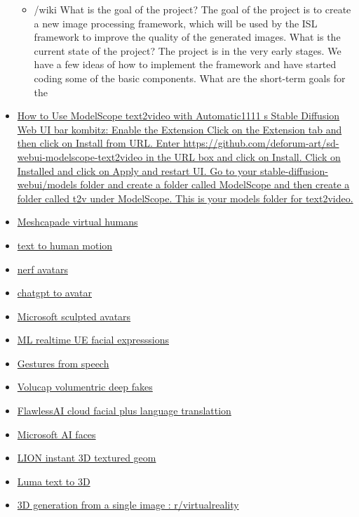 \begin{itemize}
\begin{itemize}
  \item
    /wiki What is the goal of the project? The goal of the project is to
    create a new image processing framework, which will be used by the
    ISL framework to improve the quality of the generated images. What
    is the current state of the project? The project is in the very
    early stages. We have a few ideas of how to implement the framework
    and have started coding some of the basic components. What are the
    short-term goals for the
  \end{itemize}
\item
  \href{https://www.kombitz.com/2023/03/28/how-to-use-modelscope-text2video-with-automatic1111s-stable-diffusion-web-ui/}{How
  to Use ModelScope text2video with Automatic1111 s Stable Diffusion Web
  UI bar{} kombitz: Enable the Extension Click on the Extension tab
  and then click on Install from URL. Enter
  https://github.com/deforum-art/sd-webui-modelscope-text2video in the
  URL box and click on Install. Click on Installed and click on Apply
  and restart UI. Go to your stable-diffusion-webui/models folder and
  create a folder called ModelScope and then create a folder called t2v
  under ModelScope. This is your models folder for text2video.}
\item
  \href{https://meshcapade.com/}{Meshcapade virtual humans}
\item
  \href{https://ofa-sys.github.io/MoFusion/}{text to human motion}
\item
  \href{https://www.linkedin.com/posts/reneschulte_nerf-deeplearning-metaverse-activity-7010898662465617921-56P_?utm_source=share\&utm_medium=member_desktop}{nerf
  avatars}
\item
  \href{https://twitter.com/IntuitMachine/status/1608690077139599360}{chatgpt
  to avatar}
\item
  \href{https://3d-avatar-diffusion.microsoft.com/?utm_campaign=AI\%20Art\%20Weekly\&utm_medium=email\&utm_source=Revue\%20newsletter\#/}{Microsoft
  sculpted avatars}
\item
  \href{https://80.lv/articles/ziva-dynamics-announces-a-new-ml-trained-facial-rigging-service/}{ML
  realtime UE facial expresssions}
\item
  \href{https://talkshow.is.tue.mpg.de/}{Gestures from speech}
\item
  \href{https://volucap.com/}{Volucap volumentric deep fakes}
\item
  \href{https://www.flawlessai.com/}{FlawlessAI cloud facial plus
  language translattion}
\item
  \href{https://www.youtube.com/watch?v=uboj01Gfy1A}{Microsoft AI faces}
\item
  \href{https://nv-tlabs.github.io/LION/}{LION instant 3D textured geom}
\item
  \href{https://captures.lumalabs.ai/imagine}{Luma text to 3D}
\item
  \href{https://www.reddit.com/r/virtualreality/comments/xvy5dc/3d_generation_from_a_single_image/}{3D
  generation from a single image : r/virtualreality}


\end{itemize}

